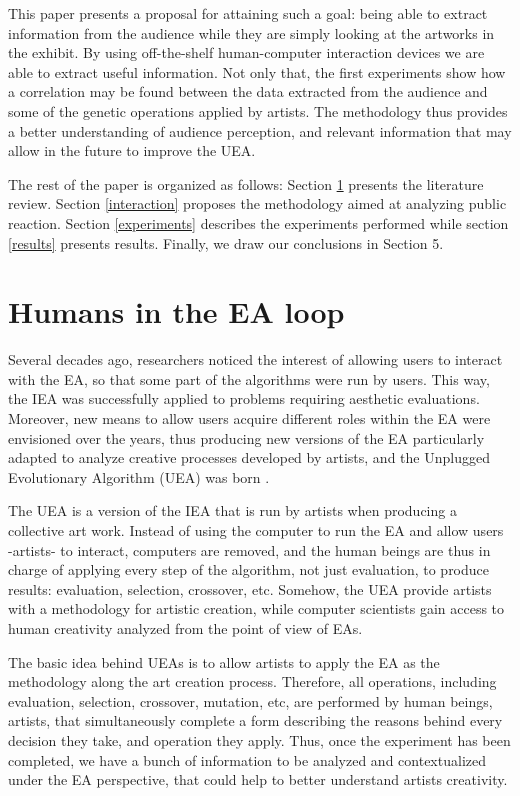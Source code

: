 \documentclass[graybox]{svmult}
\begin{document}
This paper presents a proposal for attaining such a goal:  being able to extract information from the audience while they are simply looking at the artworks in the exhibit.  By using off-the-shelf human-computer interaction devices we are able to extract useful information.  Not only that, the first experiments show how a correlation may be found between the data extracted from the audience and some of the genetic operations applied by artists.  The methodology thus provides a better understanding of audience perception, and relevant information that may allow in the future to improve the UEA.

The rest of the paper is organized as follows: Section \ref{loop} presents the literature review. Section \ref{interaction} proposes the methodology aimed at analyzing public reaction. Section \ref{experiments} describes the experiments performed while section \ref{results} presents results.  Finally, we draw our conclusions in Section 5. %


\section{Humans in the EA loop}
\label{loop}
Several decades ago, researchers noticed the interest of allowing users to interact with the EA, so that some part of the algorithms were run by users.  This way, the IEA was successfully applied to problems requiring aesthetic evaluations.  Moreover, new means to allow users acquire different roles within the EA were envisioned over the years, thus producing new versions of the EA particularly adapted to analyze creative processes developed by artists, and the Unplugged Evolutionary Algorithm (UEA) was born \cite{de2013unplugging}.

The UEA is a version of the IEA that is run by artists when producing a collective art work.  Instead of using the computer to run the EA and allow users -artists- to interact, computers are removed, and the human beings are thus in charge of applying every step of the algorithm, not just evaluation, to produce results:  evaluation, selection, crossover, etc.  Somehow, the UEA provide artists with a methodology for artistic creation, while computer scientists gain access to human creativity analyzed from the point of view of EAs.

The basic idea behind UEAs is to allow artists to apply the EA as the methodology along the art creation process.  Therefore, all operations, including evaluation, selection, crossover, mutation, etc, are performed by human beings, artists, that simultaneously complete a form describing the reasons behind every decision they take, and operation they apply. Thus, once the experiment has been completed, we have a bunch of information to be analyzed and contextualized under the EA perspective, that could help to better understand artists creativity.
\end{document}
